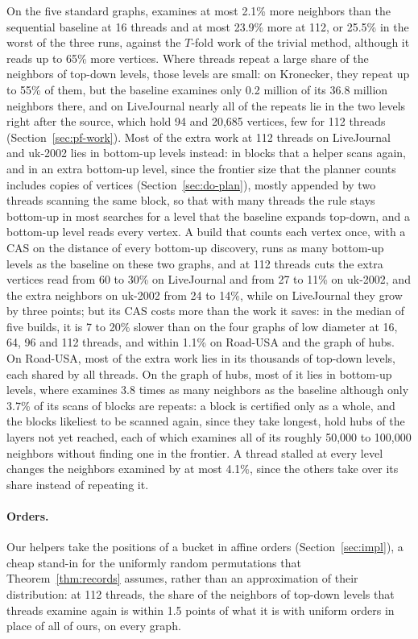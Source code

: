 On the five standard graphs, \wfdo examines at most 2.1\% more neighbors than the sequential baseline at 16 threads and at most 23.9\% more at 112, or 25.5\% in the worst of the three runs, against the $T$-fold work of the trivial method, although it reads up to 65\% more vertices. Where threads repeat a large share of the neighbors of top-down levels, those levels are small: on Kronecker, they repeat up to 55\% of them, but the baseline examines only 0.2 million of its 36.8 million neighbors there, and on LiveJournal nearly all of the repeats lie in the two levels right after the source, which hold 94 and 20,685 vertices, few for 112 threads (Section~\ref{sec:pf-work}). Most of the extra work at 112 threads on LiveJournal and uk-2002 lies in bottom-up levels instead: in blocks that a helper scans again, and in an extra bottom-up level, since the frontier size that the planner counts includes copies of vertices (Section~\ref{sec:do-plan}), mostly appended by two threads scanning the same block, so that with many threads the rule stays bottom-up in most searches for a level that the baseline expands top-down, and a bottom-up level reads every vertex. A build that counts each vertex once, with a CAS on the distance of every bottom-up discovery, runs as many bottom-up levels as the baseline on these two graphs, and at 112 threads cuts the extra vertices read from 60 to 30\% on LiveJournal and from 27 to 11\% on uk-2002, and the extra neighbors on uk-2002 from 24 to 14\%, while on LiveJournal they grow by three points; but its CAS costs more than the work it saves: in the median of five builds, it is 7 to 20\% slower than \wfdo on the four graphs of low diameter at 16, 64, 96 and 112 threads, and within 1.1\% on Road-USA and the graph of hubs. On Road-USA, most of the extra work lies in its thousands of top-down levels, each shared by all threads. On the graph of hubs, most of it lies in bottom-up levels, where \wfdo examines 3.8 times as many neighbors as the baseline although only 3.7\% of its scans of blocks are repeats: a block is certified only as a whole, and the blocks likeliest to be scanned again, since they take longest, hold hubs of the layers not yet reached, each of which examines all of its roughly 50,000 to 100,000 neighbors without finding one in the frontier. A thread stalled at every level changes the neighbors examined by at most 4.1\%, since the others take over its share instead of repeating it.

\paragraph{Orders.} Our helpers take the positions of a bucket in affine orders (Section~\ref{sec:impl}), a cheap stand-in for the uniformly random permutations that Theorem~\ref{thm:records} assumes, rather than an approximation of their distribution: at 112 threads, the share of the neighbors of top-down levels that threads examine again is within 1.5 points of what it is with uniform orders in place of all of ours, on every graph.

